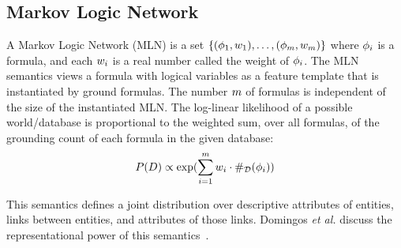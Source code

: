  	
 	\subsection{Markov Logic Network} A Markov Logic Network (MLN) \cite{Domingos2009} is a set $\{(\phi_{1},w_{1}),\ldots,(\phi_{m},w_{m})\}$ where $\phi_{i}$ is a formula, and each $w_{i}$ is a real number called the weight of $\phi_{i}$. The MLN semantics views a formula with logical variables as a feature template that is instantiated by ground formulas. The number $m$ of formulas is independent of the size of the instantiated MLN.
 	The log-linear likelihood of a possible world/database is proportional to the weighted sum, over all formulas, of the grounding count of each formula in the given database:
 	\begin{equation} \label{eq:mln} P(D) \propto \exp(\sum_{i=1}^{m} w_{i} \cdot \#_{\mathcal{D}}(\phi_{i}))\end{equation}
 	
 	This semantics defines a joint distribution over descriptive attributes of entities, links between entities, and attributes of those links. Domingos {\em et al.} discuss the representational power of this semantics~\cite{Domingos2009}. %

 		
 		
